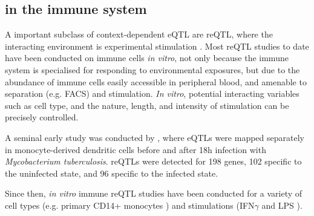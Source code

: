 \begin{outline}
\subsection{ in the immune system}
\label{subsec:intro_reQTL}

\1 A important subclass of context-dependent \gls{eQTL} are \gls{reQTL}, where the interacting environment is experimental stimulation \autocite{vandiedonck2017GeneticAssociationMolecular,huang2019GeneticsGeneExpression}.
Most \gls{reQTL} studies to date have been conducted on immune cells \textit{in vitro}, 
not only because the immune system is specialised for responding to environmental exposures,
but due to the abundance of immune cells easily accessible in peripheral blood,
and amenable to separation (e.g. FACS) and stimulation.
    \2 \textit{In vitro}, potential interacting variables such as cell type, and the nature, length, and intensity of stimulation can be precisely controlled.

\1 A seminal early study was conducted by \autocite{barreiro2012DecipheringGeneticArchitecture}, where eQTLs were mapped separately in monocyte-derived dendritic cells before and after 18h infection with \textit{Mycobacterium tuberculosis}.
    \2 reQTLs were detected for 198 genes, 102 specific to the uninfected state, and 96 specific to the infected state. 

    \2 Since then, \textit{in vitro} immune reQTL studies have been conducted for a variety of 
    cell types
        (e.g. primary CD14+ monocytes \autocite{fairfax2014InnateImmuneActivity}) 
    and stimulations 
    (IFN$\gamma$ and LPS \autocite{fairfax2014InnateImmuneActivity}).


\end{outline}
